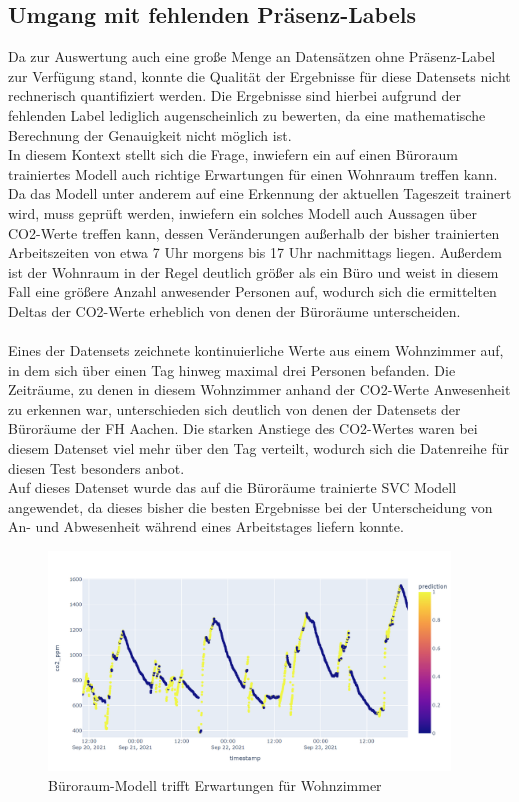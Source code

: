 \subsection{Umgang mit fehlenden Präsenz-Labels}
Da zur Auswertung auch eine große Menge an Datensätzen ohne Präsenz-Label zur Verfügung stand, konnte die 
Qualität der Ergebnisse für diese Datensets nicht rechnerisch quantifiziert werden. Die Ergebnisse
sind hierbei aufgrund der fehlenden Label lediglich augenscheinlich zu bewerten, da eine mathematische
Berechnung der Genauigkeit nicht möglich ist.\\
In diesem Kontext stellt sich die Frage, inwiefern ein auf einen Büroraum trainiertes Modell auch richtige
Erwartungen für einen Wohnraum treffen kann.
Da das Modell unter anderem auf eine Erkennung der aktuellen Tageszeit trainert wird, muss geprüft
werden, inwiefern ein solches Modell auch Aussagen über CO2-Werte treffen kann, dessen Veränderungen außerhalb
der bisher trainierten Arbeitszeiten von etwa 7 Uhr morgens bis 17 Uhr nachmittags liegen. 
Außerdem ist der Wohnraum in der Regel deutlich größer als ein Büro und weist in diesem Fall eine größere Anzahl 
anwesender Personen auf, wodurch sich die ermittelten Deltas der CO2-Werte erheblich von denen der Büroräume 
unterscheiden.\\\\
Eines der Datensets zeichnete kontinuierliche Werte aus einem Wohnzimmer auf, in dem sich über einen 
Tag hinweg maximal drei Personen befanden. Die Zeiträume, zu denen in diesem Wohnzimmer anhand der CO2-Werte
Anwesenheit zu erkennen war, unterschieden sich deutlich von denen der Datensets der Büroräume der FH Aachen. 
Die starken Anstiege des CO2-Wertes waren bei diesem Datenset viel mehr über den Tag verteilt, 
wodurch sich die Datenreihe für diesen Test besonders anbot.\\
Auf dieses Datenset wurde das auf die Büroräume trainierte  SVC Modell angewendet, da dieses bisher die 
besten Ergebnisse bei der Unterscheidung von An- und Abwesenheit während eines Arbeitstages liefern konnte. 

\begin{figure}[h]
    \centering
    \includegraphics[width=0.95\textwidth]{pic/h217_predicting_livingroom.png}
    \caption{Büroraum-Modell trifft Erwartungen für Wohnzimmer}
    \label{fig:pred_livingroom}
\end{figure}


